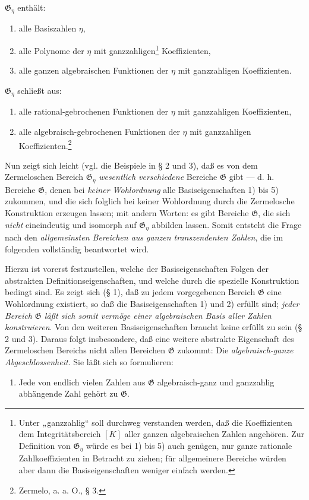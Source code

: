 \documentclass[11pt]{article}
\begin{document}
$\mathfrak G_\eta$ enthält:
\begin{enumerate}
\item[1)] alle Basiszahlen $\eta$,
\item[2)] alle Polynome der $\eta$ mit ganzzahligen\footnote{Unter
„ganzzahlig“ soll durchweg verstanden werden, daß die Koeffizienten dem
Integritätsbereich $[K]$ aller ganzen algebraischen Zahlen angehören. Zur
Definition von $\mathfrak G_\eta$ würde es bei 1) bis 5) auch genügen, nur
ganze rationale Zahlkoeffizienten in Betracht zu ziehen; für allgemeinere
Bereiche würden aber dann die Basiseigenschaften weniger einfach werden.}
Koeffizienten,
\item[3)] alle ganzen algebraischen Funktionen der $\eta$ mit ganzzahligen
Koeffizienten.
\end{enumerate}
$\mathfrak G_\eta$ schließt aus:
\begin{enumerate}
\item[4)] alle rational-gebrochenen Funktionen der $\eta$ mit ganzzahligen
Koeffizienten,
\item[5)] alle algebraisch-gebrochenen Funktionen der $\eta$ mit ganzzahligen
Koeffizienten.\footnote{Zermelo, a. a. O., § 3.}
\end{enumerate}

Nun zeigt sich leicht (vgl. die Beispiele in § 2 und 3), daß es von dem
Zermeloschen Bereich $\mathfrak G_\eta$ \emph{wesentlich verschiedene}
Bereiche $\mathfrak G$ gibt --- d. h. Bereiche $\mathfrak G$, denen bei
\emph{keiner Wohlordnung} alle Basiseigenschaften 1) bis 5) zukommen, und die
sich folglich bei keiner Wohlordnung durch die Zermelosche Konstruktion
erzeugen lassen; mit andern Worten: es gibt Bereiche $\mathfrak G$, die sich
\emph{nicht} eineindeutig und isomorph auf $\mathfrak G_\eta$ abbilden lassen.
Somit entsteht die Frage nach den \emph{allgemeinsten Bereichen aus ganzen
transzendenten Zahlen}, die im folgenden vollständig beantwortet wird.

Hierzu ist vorerst festzustellen, welche der Basiseigenschaften Folgen der
abstrakten Definitionseigenschaften, und welche durch die spezielle Konstruktion
bedingt sind. Es zeigt sich (§ 1), daß zu jedem vorgegebenen Bereich
$\mathfrak G$ eine Wohlordnung existiert, so daß die Basiseigenschaften 1) und
2) erfüllt sind; \emph{jeder Bereich $\mathfrak G$ läßt sich somit vermöge
einer algebraischen Basis aller Zahlen konstruieren}. Von den weiteren
Basiseigenschaften braucht keine erfüllt zu sein (§ 2 und 3). Daraus folgt
insbesondere, daß eine weitere abstrakte Eigenschaft des Zermeloschen Bereichs
nicht allen Bereichen $\mathfrak G$ zukommt: Die \emph{algebraisch-ganze
Abgeschlossenheit}. Sie läßt sich so formulieren:
\begin{enumerate}
\item[V.] Jede von endlich vielen Zahlen aus $\mathfrak G$ algebraisch-ganz
und ganzzahlig abhängende Zahl gehört zu $\mathfrak G$.
\end{enumerate}
\end{document}
